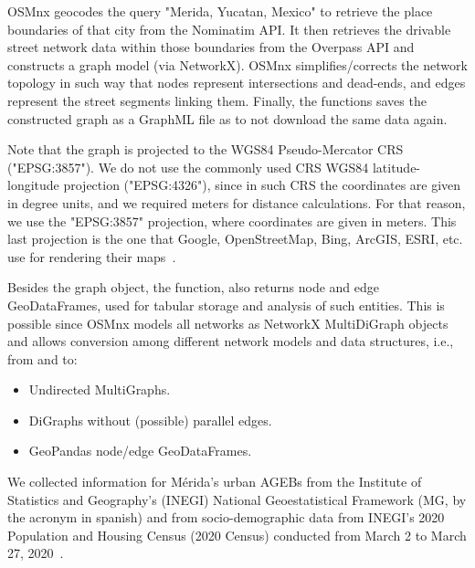 OSMnx geocodes the query "Merida, Yucatan, Mexico" to retrieve the place boundaries of that city from the Nominatim API. It then retrieves the drivable street network data within those boundaries from the Overpass API and constructs a graph model (via NetworkX). OSMnx simplifies/corrects the network topology in such way that nodes represent intersections and dead-ends, and edges represent the street segments linking them. Finally, the functions saves the constructed graph as a GraphML file as to not download the same data again.

Note that the graph is projected to the WGS84 Pseudo-Mercator CRS ("EPSG:3857"). We do not use the commonly used CRS WGS84 latitude-longitude projection ("EPSG:4326"), since in such CRS the coordinates are given in degree units, and we required meters for distance calculations. For that reason, we use the "EPSG:3857" projection, where coordinates are given in meters. This last projection is the one that Google, OpenStreetMap, Bing, ArcGIS, ESRI, etc. use for rendering their maps~\cite{epsg3857}.


Besides the graph object, the function, also returns node and edge GeoDataFrames, used for tabular storage and analysis of such entities. This is possible since OSMnx models all networks as NetworkX MultiDiGraph objects and allows conversion among different network models and data structures, i.e., from and to:

\begin{itemize}
 \item Undirected MultiGraphs.
 \item DiGraphs without (possible) parallel edges.
 \item GeoPandas node/edge GeoDataFrames.
\end{itemize}


We collected information for Mérida's urban AGEBs from the Institute of Statistics and Geography's (INEGI) National Geoestatistical Framework (MG, by the acronym in spanish) and from socio-demographic data from INEGI's 2020 Population and Housing Census (2020 Census) conducted from March 2 to March 27, 2020~\cite{2020census}.

